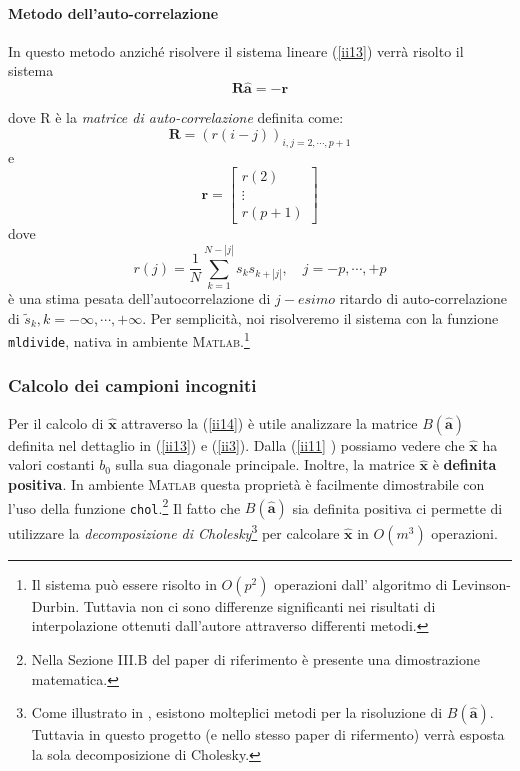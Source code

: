 \documentclass{article}
\newcommand{\abs}[1]{\left|#1\right|}
\begin{document}
\paragraph{Metodo dell'auto-correlazione} In questo metodo anziché risolvere il sistema lineare (\ref{ii13}) verrà risolto il sistema
\[ \mathbf{R\hat{a}} = - \mathbf{r}  \]

dove R è la \emph{matrice di auto-correlazione} definita come:
\[
\mathbf{R} = (r(i-j))_{i,j=2,\cdots,p+1}
\]
e 
\[
\mathbf{r} = 
\left[
\begin{array}{c}
r(2) \\ \vdots \\ r(p+1)
\end{array}
\right]
\]
dove
\[
r(j) = \frac{1}{N} \sum_{k=1}^{N-\abs{j}} s_{k}s_{k+\abs{j}} ,
\quad
j= -p, \cdots, +p
\]
è una stima pesata dell'autocorrelazione di $j-esimo$ ritardo di auto-correlazione di $\tilde{s}_{k}, k = -\infty,\cdots,+\infty$. Per semplicità, noi risolveremo il sistema con la funzione \texttt{mldivide}, nativa in ambiente \textsc{Matlab}.\footnote{Il sistema può essere risolto in $O(p^{2})$ operazioni dall' algoritmo di Levinson-Durbin. \cite{art12}
Tuttavia non ci sono differenze significanti nei risultati di interpolazione ottenuti dall'autore attraverso differenti metodi.}
	
	
	\subsubsection{Calcolo dei campioni incogniti}
Per il calcolo di $\mathbf{\hat{x}}$ attraverso la (\ref{ii14}) è utile analizzare la matrice 
$B(\mathbf{\hat{a}})$ definita nel dettaglio in (\ref{ii13}) e (\ref{ii3}). Dalla (\ref{ii11}
) possiamo vedere che $\mathbf{\hat{x}}$ ha valori costanti $b_{0}$ sulla sua diagonale principale.
Inoltre, la matrice $\mathbf{\hat{x}}$ è \textbf{definita positiva}. In ambiente \textsc{Matlab} questa proprietà è facilmente dimostrabile con l'uso della funzione \texttt{chol}.\footnote{Nella Sezione III.B del paper \cite{paper_1986} di riferimento è presente una dimostrazione matematica.}
Il fatto che $B(\mathbf{\hat{a}})$ sia definita positiva ci permette di utilizzare la \emph{decomposizione di Cholesky}\footnote{
Come illustrato in \cite[Sezione III.B]{paper_1986}, esistono molteplici metodi per la risoluzione di $B(\mathbf{\hat{a}})$. Tuttavia in questo progetto (e nello stesso paper di rifermento) verrà esposta la sola decomposizione di Cholesky.
} per calcolare $\mathbf{\hat{x}}$ in $O(m^{3})$ operazioni.
\end{document}
